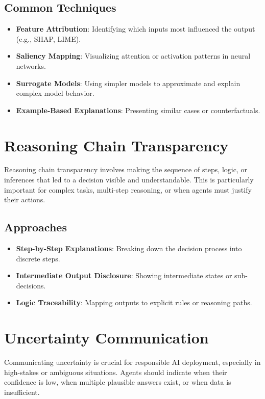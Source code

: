 \begin{TNtwocol}
\subsection{Common Techniques}
\begin{itemize}
    \item \textbf{Feature Attribution}: Identifying which inputs most influenced the output (e.g., SHAP, LIME).
    \item \textbf{Saliency Mapping}: Visualizing attention or activation patterns in neural networks.
    \item \textbf{Surrogate Models}: Using simpler models to approximate and explain complex model behavior.
    \item \textbf{Example-Based Explanations}: Presenting similar cases or counterfactuals.
\end{itemize}

\section{Reasoning Chain Transparency}
Reasoning chain transparency involves making the sequence of steps, logic, or inferences that led to a decision visible and understandable. This is particularly important for complex tasks, multi-step reasoning, or when agents must justify their actions.

\subsection{Approaches}
\begin{itemize}
    \item \textbf{Step-by-Step Explanations}: Breaking down the decision process into discrete steps.
    \item \textbf{Intermediate Output Disclosure}: Showing intermediate states or sub-decisions.
    \item \textbf{Logic Traceability}: Mapping outputs to explicit rules or reasoning paths.
\end{itemize}

\section{Uncertainty Communication}
Communicating uncertainty is crucial for responsible AI deployment, especially in high-stakes or ambiguous situations. Agents should indicate when their confidence is low, when multiple plausible answers exist, or when data is insufficient.


\end{TNtwocol}
